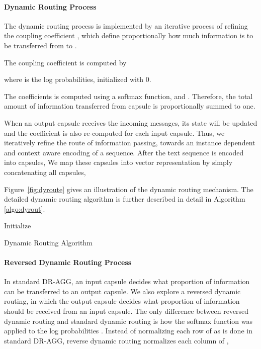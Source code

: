 \documentclass[11pt]{article}
\begin{document}
\paragraph{Dynamic Routing Process}
The dynamic routing process is implemented by an iterative process of refining the coupling coefficient , which define proportionally how much information is to be transferred from  to .

The coupling coefficient  is computed by

where  is the log probabilities, initialized with 0.

The coefficients  is computed using a softmax function, and . Therefore, the total amount of information transferred from capsule  is proportionally summed to one.

When an output capsule  receives the incoming messages, its state will be updated and the coefficient  is also re-computed for each input capsule. Thus, we iteratively refine the route of information passing, towards an instance dependent and context aware encoding of a sequence.
After the text sequence is encoded into  capsules,
We  map these capsules into vector representation by simply concatenating all capsules,
 

Figure~\ref{fig:dyroute} gives an illustration of the dynamic routing mechanism. The detailed dynamic routing algorithm is further described in detail in Algorithm \ref{algo:dyrout}.



\begin{algorithm}\SetAlgoLined
{}
 Initialize  \;
 \KwRet{}
 \caption{Dynamic Routing Algorithm}
	\label{algo:dyrout}
\end{algorithm}

\paragraph{Reversed Dynamic Routing Process}

In standard DR-AGG, an input capsule decides what proportion of information can be transferred to an output capsule. We also explore a reversed dynamic routing, in which the output capsule decides what proportion of information should be received from an input capsule. The only difference between reversed dynamic routing and standard dynamic routing is how the softmax function was applied to the log probabilities . Instead of normalizing each row of  as is done in standard DR-AGG, reverse dynamic routing normalizes each column of ,
\end{document}
